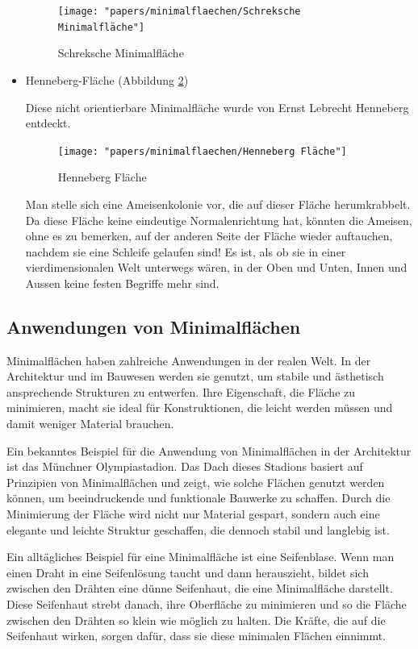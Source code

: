 \begin{itemize}
\begin{figure}
	\centering
	\texttt{[image: "papers/minimalflaechen/Schreksche Minimalfläche"]}
	\caption{Schreksche Minimalfläche}
	\label{fig:schreksche-minimalflache}
\end{figure}
	\item
	Henneberg-Fläche (Abbildung \ref{fig:henneberg-flache})
	
	Diese nicht orientierbare Minimalfläche wurde von Ernst Lebrecht Henneberg entdeckt.
\begin{figure}
	\centering
	\texttt{[image: "papers/minimalflaechen/Henneberg Fläche"]}
	\caption{Henneberg Fläche}
	\label{fig:henneberg-flache}
\end{figure}

Man stelle sich eine Ameisenkolonie vor, die auf dieser Fläche herumkrabbelt.
Da diese Fläche keine eindeutige Normalenrichtung hat, könnten die Ameisen, ohne es zu bemerken, auf der anderen Seite der Fläche wieder auftauchen, nachdem sie eine Schleife gelaufen sind!
Es ist, als ob sie in einer vierdimensionalen Welt unterwegs wären, in der Oben und Unten, Innen und Aussen keine festen Begriffe mehr sind.


\end{itemize}

\subsection{Anwendungen von Minimalflächen
	\label{minimalflaechen:subsection:Anwendungen von Minimalflächen}}
Minimalflächen haben zahlreiche Anwendungen in der realen Welt.
In der Architektur und im Bauwesen werden sie genutzt, um stabile und ästhetisch ansprechende Strukturen zu entwerfen.
Ihre Eigenschaft, die Fläche zu minimieren, macht sie ideal für Konstruktionen, die leicht werden müssen und damit weniger Material brauchen.

Ein bekanntes Beispiel für die Anwendung von Minimalflächen in der Architektur ist das Münchner Olympiastadion.
Das Dach dieses Stadions basiert auf Prinzipien von Minimalflächen und zeigt, wie solche Flächen genutzt werden können, um beeindruckende und funktionale Bauwerke zu schaffen.
Durch die Minimierung der Fläche wird nicht nur Material gespart, sondern auch eine elegante und leichte Struktur geschaffen, die dennoch stabil und langlebig ist.

Ein alltägliches Beispiel für eine Minimalfläche ist eine Seifenblase.
Wenn man einen Draht in eine Seifenlösung taucht und dann herauszieht, bildet sich zwischen den Drähten eine dünne Seifenhaut, die eine Minimalfläche darstellt.
Diese Seifenhaut strebt danach, ihre Oberfläche zu minimieren und so die Fläche zwischen den Drähten so klein wie möglich zu halten.
Die Kräfte, die auf die Seifenhaut wirken, sorgen dafür, dass sie diese minimalen Flächen einnimmt.

